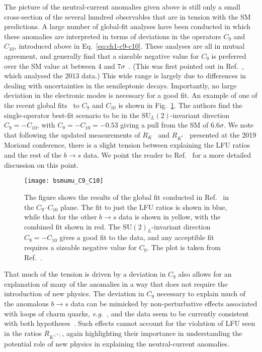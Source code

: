 The picture of the neutral-current anomalies given above is still only a small
cross-section of the several hundred observables that are in tension with the SM
predictions. A large number of global-fit analyses have been conducted in which
these anomalies are interpreted in terms of deviations in the operators $C_{9}$
and $C_{10}$, introduced above in Eq.~\eqref{eq:ch1-c9-c10}. These analyses are all
in mutual agreement, and generally find that a sizeable negative value for
$C_{9}$ is preferred over the SM value at between 4 and
$7\sigma$~\cite{Aebischer:2019mlg, Alguero:2019ptt, Arbey:2019duh,
  Ciuchini:2019usw}. (This was first pointed out in
Ref.~\cite{Descotes-Genon:2013wba}, which analysed the 2013 data.) This wide
range is largely due to differences in dealing with uncertainties in the
semileptonic decays. Importantly, no large deviation in the electronic modes is
necessary for a good fit. An example of one of the recent global
fits~\cite{Aebischer:2019mlg} to $C_{9}$ and $C_{10}$ is shown in
Fig.~\ref{fig:ch1-c9-c10-fit}. The authors find the single-operator best-fit
scenario to be in the $\mathrm{SU}_{L}(2)$-invariant direction
$C_{9} = -C_{10}$, with $C_{9} = -C_{10} = -0.53$ giving a pull from the SM of
$6.6\sigma$. We note that following the updated measurements of
$R_{K}$~\cite{Aaij:2019wad} and $R_{K^{*}}$~\cite{Abdesselam:2019wac} presented
at the 2019 Moriond conference, there is a slight tension between explaining the
LFU ratios and the rest of the $b\to s$ data. We point the reader to
Ref.~\cite{Aebischer:2019mlg} for a more detailed discussion on this point.

\begin{figure}[t]
  \centering
  \texttt{[image: bsmumu\_C9\_C10]}
  \caption[The figure shows the results of the global fit conducted in
  Ref.~\cite{Aebischer:2019mlg} in the $C_{9}$--$C_{10}$ plane.]{The figure
    shows the results of the global fit conducted in
    Ref.~\cite{Aebischer:2019mlg} in the $C_{9}$--$C_{10}$ plane. The fit to
    just the LFU ratios is shown in blue, while that for the other $b\to s$ data
    is shown in yellow, with the combined fit shown in red. The
    $\mathrm{SU}(2)_{L}$-invariant direction $C_{9}=-C_{10}$ gives a good fit to
    the data, and any acceptible fit requires a sizeable negative value for
    $C_{9}$. The plot is taken from Ref.~\cite{Aebischer:2019mlg}.}
  \label{fig:ch1-c9-c10-fit}
\end{figure}

That much of the tension is driven by a deviation in $C_{9}$ also allows for an
explanation of many of the anomalies in a way that does not require the
introduction of new physics. The deviation in $C_{9}$ necessary to explain much
of the anomalous $b \to s$ data can be mimicked by non-perturbative effects
associated with loops of charm quarks, \textit{e.g.}~\cite{Blake:2017wjz}, and
the data seem to be currently consistent with both
hypotheses~\cite{Altmannshofer:2015sma, Descotes-Genon:2015uva}. Such effects
cannot account for the violation of LFU seen in the ratios $R_{K^{(*)}}$, again
highlighting their importance in understanding the potential role of new physics
in explaining the neutral-current anomalies.

